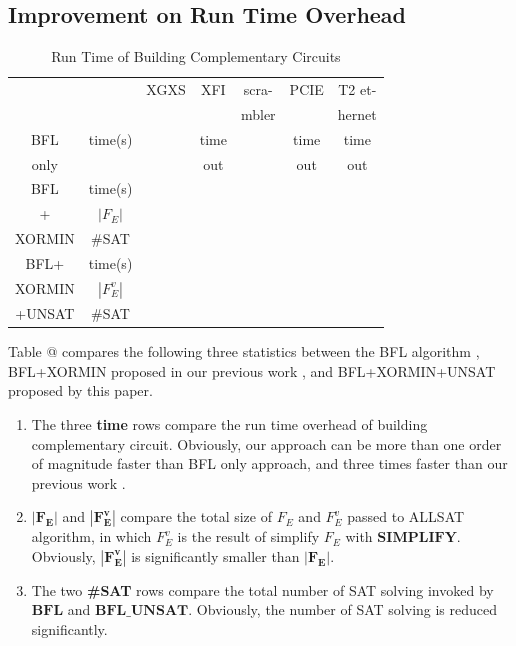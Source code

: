 \documentclass[journal]{IEEEtran}
\makeatletter
\newcommand{\Rmnum}[1]{\expandafter\@slowromancap\romannumeral #1@}
\makeatother
\begin{document}
\subsection{Improvement on Run Time Overhead}
\begin{table}[!t]
\centering
\caption{Run Time of Building Complementary Circuits}
\begin{tabular}{|c|c|c|c|c|c|c|}
\hline
            &&XGXS&XFI& scra-   &PCIE&T2 et-	  \\
            &&       &      & mbler&    &  hernet      	  \\ \hline
BFL    &time(s)&   &time&&time&time 		     \\
only&&&out&&out&out 		     \\ \hline
BFL    &time(s)&   &&     && 		     \\ \cline{2-7}
+   &$|F_E|$&&&&&\\ \cline{2-7}
XORMIN      &\#SAT&&&&&        	  \\ \hline
BFL+     &time(s)&   &&      &&        	  \\ \cline{2-7}
XORMIN     &$|F_E^v|$&&&&&\\ \cline{2-7}
+UNSAT       &\#SAT&&&&&        	  \\ \hline
\end{tabular}
\end{table}
Table \Rmnum{3} compares the following three statistics between the BFL algorithm \cite{MINASS},
BFL+XORMIN proposed in our previous work \cite{ShegnYuShen:iccad09},
and BFL+XORMIN+UNSAT proposed by this paper.
\begin{enumerate}
\item The three \textbf{time} rows compare the run time overhead of building complementary circuit.
Obviously,
our approach can be more than one order of magnitude faster than BFL only approach,
and three times faster than our previous work \cite{ShegnYuShen:iccad09}.
\item $\boldsymbol{|F_E|}$ and $\boldsymbol{|F_E^v|}$ compare the total size of $F_E$ and $F_E^v$ passed to ALLSAT algorithm,
in which $F_E^v$ is the result of simplify $F_E$ with $\boldsymbol{SIMPLIFY}$.
Obviously,
$\boldsymbol{|F_E^v|}$ is significantly smaller than $\boldsymbol{|F_E|}$.
\item The two \textbf{\#SAT} rows compare the total number of SAT solving invoked by $\boldsymbol{BFL}$ and $\boldsymbol{BFL\_UNSAT}$.
Obviously,
the number of SAT solving is reduced significantly.
\end{enumerate}
\end{document}
